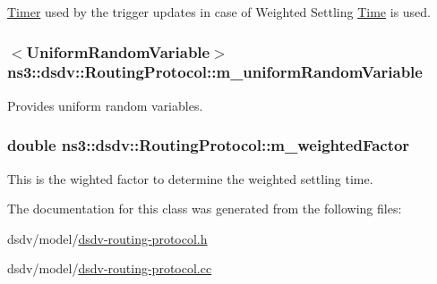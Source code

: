 \hyperlink{classns3_1_1Timer}{Timer} used by the trigger updates in case of Weighted Settling \hyperlink{classns3_1_1Time}{Time} is used. 

\subsubsection[{\texorpdfstring{m\+\_\+uniform\+Random\+Variable}{m_uniformRandomVariable}}]{$<${\bf Uniform\+Random\+Variable}$>$ ns3\+::dsdv\+::\+Routing\+Protocol\+::m\+\_\+uniform\+Random\+Variable\hspace{0.3cm}{\ttfamily [private]}}\hypertarget{classns3_1_1dsdv_1_1RoutingProtocol_a2d5efde0680b47457d0b94d0493c9eec}{}\label{classns3_1_1dsdv_1_1RoutingProtocol_a2d5efde0680b47457d0b94d0493c9eec}


Provides uniform random variables. 

\subsubsection[{\texorpdfstring{m\+\_\+weighted\+Factor}{m_weightedFactor}}]{\setlength{\rightskip}{0pt plus 5cm}double ns3\+::dsdv\+::\+Routing\+Protocol\+::m\+\_\+weighted\+Factor\hspace{0.3cm}{\ttfamily [private]}}\hypertarget{classns3_1_1dsdv_1_1RoutingProtocol_afd15e37062d937b28ba081fc515f3a77}{}\label{classns3_1_1dsdv_1_1RoutingProtocol_afd15e37062d937b28ba081fc515f3a77}


This is the wighted factor to determine the weighted settling time. 



The documentation for this class was generated from the following files\+:\begin{DoxyCompactItemize}
\item 
dsdv/model/\hyperlink{dsdv-routing-protocol_8h}{dsdv-\/routing-\/protocol.\+h}\item 
dsdv/model/\hyperlink{dsdv-routing-protocol_8cc}{dsdv-\/routing-\/protocol.\+cc}\end{DoxyCompactItemize}
